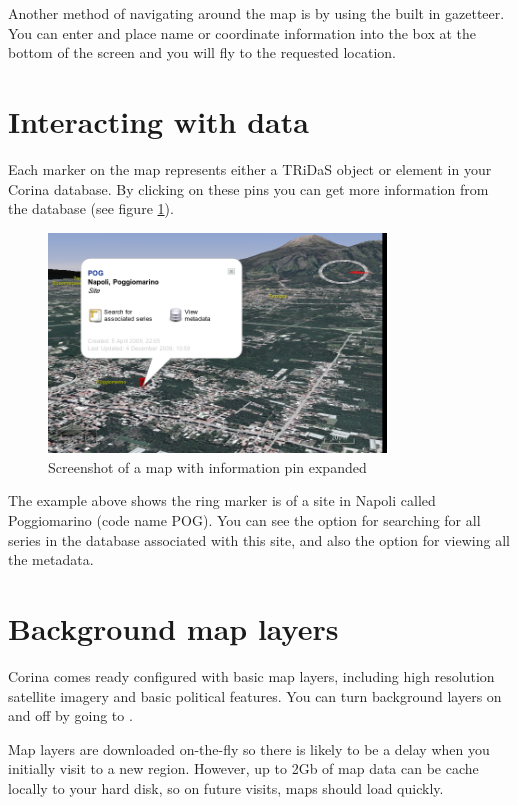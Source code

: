 Another method of navigating around the map is by using the built in gazetteer. You can enter and place name or coordinate information into the box at the bottom of the screen and you will fly to the requested location. 


\section{Interacting with data}

Each marker on the map represents either a TRiDaS object or element in your Corina database. By clicking on these pins you can get more information from the database (see figure \ref{fig:mappin}).

\begin{figure}[hbtp]
  \centering
  \includegraphics[width=0.8\textwidth]{Images/mappinexample.png}
  \caption{Screenshot of a map with information pin expanded}
  \label{fig:mappin}
\end{figure}

The example above shows the ring marker is of a site in Napoli called Poggiomarino (code name POG). You can see the option for searching for all series in the database associated with this site, and also the option for viewing all the metadata. 

\section{Background map layers}
\label{txt:userAddWMS}

Corina comes ready configured with basic map layers, including high resolution satellite imagery and basic political features. You can turn background layers on and off by going to .

Map layers are downloaded on-the-fly so there is likely to be a delay when you initially visit to a new region. However, up to 2Gb of map data can be cache locally to your hard disk, so on future visits, maps should load quickly.

